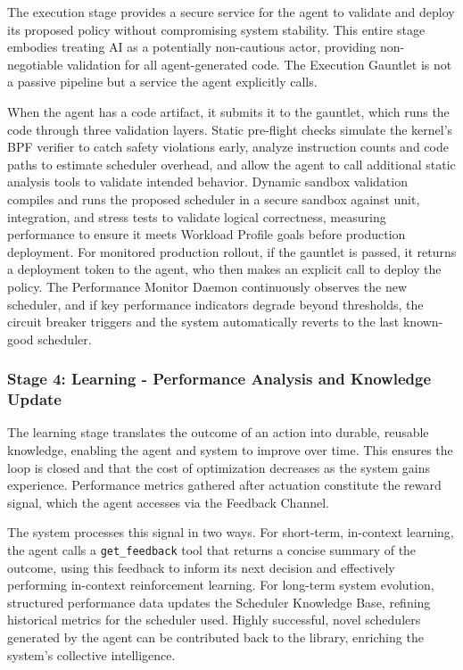 The execution stage provides a secure service for the agent to validate and deploy its proposed policy without compromising system stability. This entire stage embodies treating AI as a potentially non-cautious actor, providing non-negotiable validation for all agent-generated code. The Execution Gauntlet is not a passive pipeline but a service the agent explicitly calls.

When the agent has a code artifact, it submits it to the gauntlet, which runs the code through three validation layers. Static pre-flight checks simulate the kernel's BPF verifier to catch safety violations early, analyze instruction counts and code paths to estimate scheduler overhead, and allow the agent to call additional static analysis tools to validate intended behavior. Dynamic sandbox validation compiles and runs the proposed scheduler in a secure sandbox against unit, integration, and stress tests to validate logical correctness, measuring performance to ensure it meets Workload Profile goals before production deployment. For monitored production rollout, if the gauntlet is passed, it returns a deployment token to the agent, who then makes an explicit call to deploy the policy. The Performance Monitor Daemon continuously observes the new scheduler, and if key performance indicators degrade beyond thresholds, the circuit breaker triggers and the system automatically reverts to the last known-good scheduler.

\subsubsection{Stage 4: Learning - Performance Analysis and Knowledge Update}

The learning stage translates the outcome of an action into durable, reusable knowledge, enabling the agent and system to improve over time. This ensures the loop is closed and that the cost of optimization decreases as the system gains experience. Performance metrics gathered after actuation constitute the reward signal, which the agent accesses via the Feedback Channel.

The system processes this signal in two ways. For short-term, in-context learning, the agent calls a \texttt{get\_feedback} tool that returns a concise summary of the outcome, using this feedback to inform its next decision and effectively performing in-context reinforcement learning. For long-term system evolution, structured performance data updates the Scheduler Knowledge Base, refining historical metrics for the scheduler used. Highly successful, novel schedulers generated by the agent can be contributed back to the library, enriching the system's collective intelligence.
